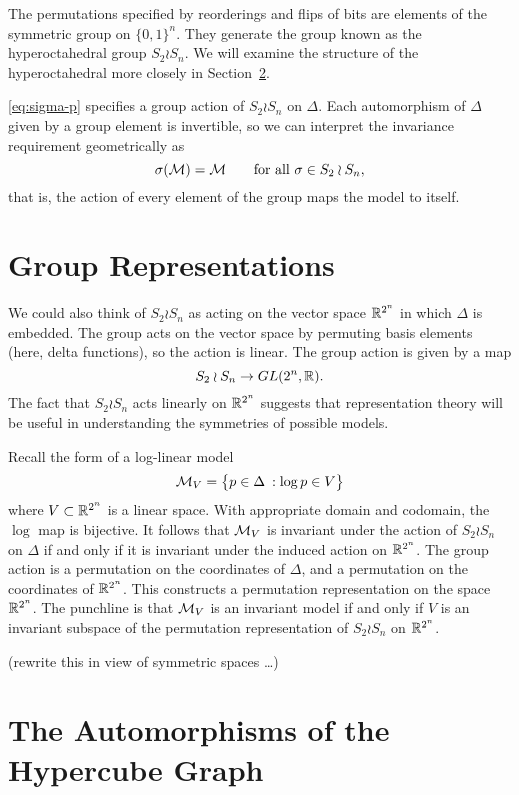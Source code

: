 \documentclass[cclicense]{hmcthesis}
\numberwithin{equation}{chapter}
\numberwithin{thmcounter}{chapter}
\begin{document}
    The permutations specified by reorderings and flips of bits are elements of
    the symmetric group on $\{0, 1\}^n$.  They generate the group known as the
    hyperoctahedral group $S_2 \wr S_n$.  We will examine the structure of the
    hyperoctahedral more closely in Section~\ref{sec:hyperoctahedral}.

    \eqref{eq:sigma-p} specifies a group action of $S_2 \wr S_n$ on $\Delta$.
    Each automorphism of $\Delta$ given by a group element is invertible, so we
    can interpret the invariance requirement geometrically as
    \[
        \sigma(\ms) = \ms
        \qquad
        \text{for all $\sigma \in S_2 \wr S_n$},
    \]
    that is, the action of every element of the group maps the model to itself.

\section{Group Representations}

    We could also think of $S_2 \wr S_n$ as acting on the vector space
    $\R^{2^n}$ in which $\Delta$ is embedded.  The group acts on the
    vector space by permuting basis elements (here, delta functions), so the
    action is linear.  The group action is given by a map
    \[
        S_2 \wr S_n \to GL(2^n, \R).
    \]
    The fact that $S_2 \wr S_n$ acts linearly on $\R^{2^n}$ suggests that
    representation theory will be useful in understanding the symmetries of
    possible models.  
    
    Recall the form of a log-linear model
    \[
        \ms_V = \cdel[\big]{p \in \Delta \:: \log p \in V}
    \]
    where $V \subset \R^{2^n}$ is a linear space.  With appropriate domain and
    codomain, the $\log$ map is bijective.  It follows that $\ms_V$ is invariant
    under the action of $S_2 \wr S_n$ on $\Delta$ if and only if it is invariant
    under the induced action on $\R^{2^n}$.  The group action is a permutation
    on the coordinates of $\Delta$, and a permutation on the coordinates of
    $\R^{2^n}$.  This constructs a permutation representation on the space
    $\R^{2^n}$.  The punchline is that $\ms_V$ is an invariant model if and only
    if $V$ is an invariant subspace of the permutation representation
    of $S_2 \wr S_n$ on $\R^{2^n}$.

    (rewrite this in view of symmetric spaces \ldots)

\section{The Automorphisms of the Hypercube Graph}
    \label{sec:hyperoctahedral}
\end{document}
